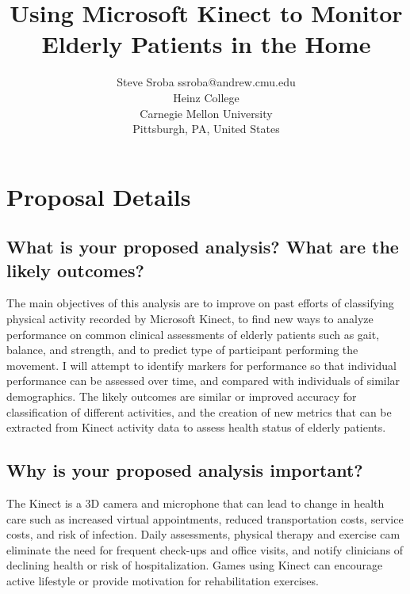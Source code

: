 \documentclass[twoside,11pt]{article}
\begin{document}
\title{Using Microsoft Kinect to Monitor Elderly Patients in the Home}

\author{\name Steve Sroba \email ssroba@andrew.cmu.edu \\
       \addr Heinz College\\
       Carnegie Mellon University\\
       Pittsburgh, PA, United States} 

\maketitle


\section{Proposal Details} \label{details}


\subsection{What is your proposed analysis? What are the likely outcomes?}

  The main objectives of this analysis are to improve on past efforts of classifying physical activity recorded by Microsoft Kinect, to find new ways to analyze performance on common clinical assessments of elderly patients such as gait, balance, and strength, and to predict type of participant performing the movement. I will attempt to identify markers for performance so that individual performance can be assessed over time, and compared with individuals of similar demographics. The likely outcomes are similar or improved accuracy for classification of different activities, and the creation of new metrics that can be extracted from Kinect activity data to assess health status of elderly patients.

\subsection{Why is your proposed analysis important?}

  The Kinect is	a 3D camera and microphone that can lead to change in health care such as increased virtual appointments, reduced transportation costs, service costs, and risk of infection. Daily assessments, physical therapy and exercise cam eliminate the need for frequent check-ups and office visits, and notify clinicians of declining health or risk of hospitalization. Games using Kinect can encourage active lifestyle or provide motivation for rehabilitation exercises\citep{cite1}.
\end{document}
